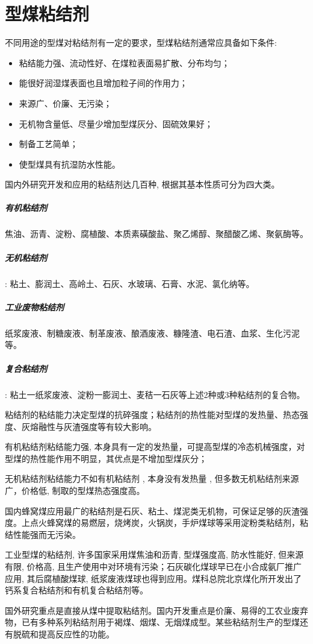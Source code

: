 \documentclass[10pt,openany]{ctexbook}
\begin{document}
    \section{型煤粘结剂}
    不同用途的型煤对粘结剂有一定的要求，型煤粘结剂通常应具备如下条件:
    \begin{itemize}
 \item   粘结能力强、流动性好、在煤粒表面易扩散、分布均匀；
  \item  能很好润湿煤表面也且增加粒子间的作用力；
  \item  来源广、价廉、无污染；
  \item  无机物含量低、尽量少增加型煤灰分、固硫效果好；
 \item  制备工艺简单；
  \item  使型煤具有抗湿防水性能。

    \end{itemize}
   国内外研究开发和应用的粘结剂达几百种, 根据其基本性质可分为四大类。
 \subparagraph{有机粘结剂} 焦油、沥青、淀粉、腐植酸、本质素磺酸盐、聚乙烯醇、聚醋酸乙烯、聚氨酶等。
 \subparagraph{无机粘结剂 } : 粘土、膨润土、高岭土、石灰、水玻璃、石膏、水泥、氯化纳等。
 \subparagraph{工业废物粘结剂} 纸浆废液、制糖废液、制革废液、酿酒废液、糠隆渣、电石渣、血浆、生化污泥等。
 \subparagraph{复合粘结剂 } : 粘土一纸浆废液、淀粉一膨润土、麦秸一石灰等上述2种或3种粘结剂的复合物。\par
粘结剂的粘结能力决定型煤的抗碎强度；粘结剂的热性能对型煤的发热量、热态强度、灰熔融性与灰渣强度等有较大影响。\par
    有机粘结剂粘结能力强, 本身具有一定的发热量，可提高型煤的冷态机械强度，对型煤的热性能作用不明显，其优点是不增加型煤灰分；\par
    无机粘结剂粘结能力不如有机粘结剂 , 本身没有发热量 , 但多数无机粘结剂来源广，价格低, 制取的型煤热态强度高。\par
    国内蜂窝煤应用最广的粘结剂是石灰、粘土、煤泥类无机物，可保证足够的灰渣强度。上点火蜂窝煤的易燃层，烧烤炭，火锅炭，手炉煤球等采用淀粉类粘结剂，粘结性能强而无污染。 \par
工业型煤的粘结剂, 许多国家采用煤焦油和沥青, 型煤强度高, 防水性能好, 但来源有限, 价格高, 且生产使用中对环境有污染；石灰碳化煤球早已在小合成氨厂推广应用, 其后腐植酸煤球, 纸浆废液煤球也得到应用。煤科总院北京煤化所开发出了钙系复合粘结剂和有机复合粘结剂等。\par
    国外研究重点是直接从煤中提取粘结剂。国内开发重点是价廉、易得的工农业废弃物，已有多种系列粘结剂用于褐煤、烟煤、无烟煤成型。某些粘结剂生产的型煤还有脱硫和提高反应性的功能。
\end{document}
